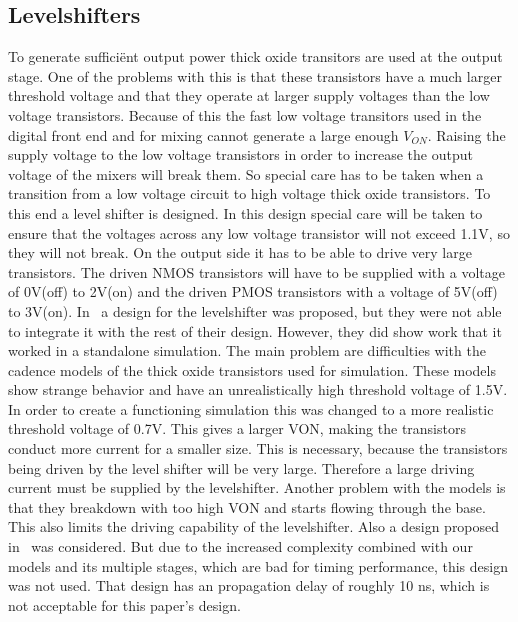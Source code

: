 \makeatletter
\newcommand*{\textoverline}[1]{$\overline{\hbox{#1}}\m@th$}
\makeatother

\subsection{Levelshifters}\label{sec:levelshifter}
To generate suffici\"{e}nt output power thick oxide transitors are used at the output stage. One of the problems with this is that these transistors have a much larger threshold voltage and that they operate at larger supply voltages than the low voltage transistors. Because of this the fast low voltage transitors used in the digital front end and for mixing cannot generate a large enough $V_{ON}$. Raising the supply voltage to the low voltage transistors in order to increase the output voltage of the mixers will break them. So special care has to be taken when a transition from a low voltage circuit to high voltage thick oxide transistors. To this end a level shifter is designed. In this design special care will be taken to ensure that the voltages across any low voltage transistor will not exceed 1.1V, so they will not break. On the output side it has to be able to drive very large transistors. The driven NMOS transistors will have to be supplied with a voltage of 0V(off) to 2V(on) and the driven PMOS transistors with a voltage of 5V(off) to 3V(on). 
In~\cite{powerdac} a design for the levelshifter was proposed, but they were not able to integrate it with the rest of their design. However, they did show work that it worked in a standalone simulation. The main problem are difficulties with the cadence models of the thick oxide transistors used for simulation. These models show strange behavior and have an unrealistically high threshold voltage of 1.5V. In order to create a functioning simulation this was changed to a more realistic threshold voltage of 0.7V. This gives a larger VON, making the transistors conduct more current for a smaller size. This is necessary, because the transistors being driven by the level shifter will be very large. Therefore a large driving current must be supplied by the levelshifter. Another problem with the models is that they breakdown with too high VON and starts flowing through the base. This also limits the driving capability of the levelshifter. Also a design proposed in~\cite{hass2000level} was considered. But due to the increased complexity combined with our models and its multiple stages, which are bad for timing performance, this design was not used. That design has an propagation delay of roughly 10 ns, which is not acceptable for this paper's design. 
